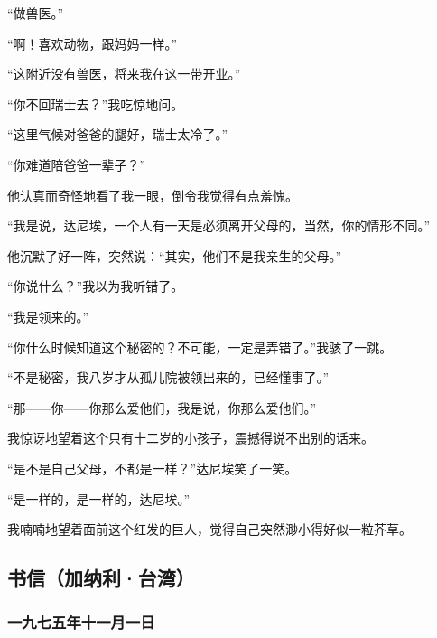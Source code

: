 \par “做兽医。”
\par “啊！喜欢动物，跟妈妈一样。”
\par “这附近没有兽医，将来我在这一带开业。”
\par “你不回瑞士去？”我吃惊地问。
\par “这里气候对爸爸的腿好，瑞士太冷了。”
\par “你难道陪爸爸一辈子？”
\par 他认真而奇怪地看了我一眼，倒令我觉得有点羞愧。
\par “我是说，达尼埃，一个人有一天是必须离开父母的，当然，你的情形不同。”
\par 他沉默了好一阵，突然说：“其实，他们不是我亲生的父母。”
\par “你说什么？”我以为我听错了。
\par “我是领来的。”
\par “你什么时候知道这个秘密的？不可能，一定是弄错了。”我骇了一跳。
\par “不是秘密，我八岁才从孤儿院被领出来的，已经懂事了。”
\par “那——你——你那么爱他们，我是说，你那么爱他们。”
\par 我惊讶地望着这个只有十二岁的小孩子，震撼得说不出别的话来。
\par “是不是自己父母，不都是一样？”达尼埃笑了一笑。
\par “是一样的，是一样的，达尼埃。”
\par 我喃喃地望着面前这个红发的巨人，觉得自己突然渺小得好似一粒芥草。


\subsection{书信（加纳利·台湾）}





\subsubsection{一九七五年十一月一日}


